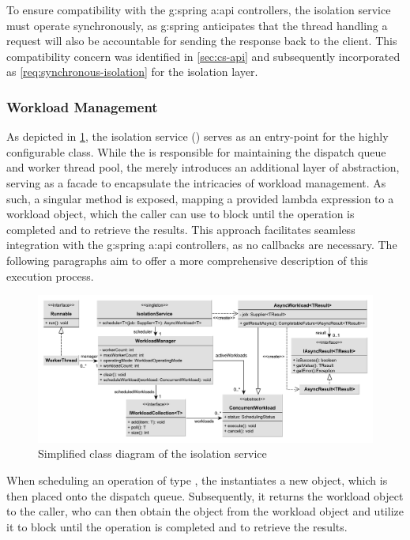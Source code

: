 To ensure compatibility with the \gls{g:spring} \gls{a:api} controllers, the isolation service must operate synchronously, as \gls{g:spring} anticipates that the thread handling a request will also be accountable for sending the response back to the client. This compatibility concern was identified in \cref{sec:cs-api} and subsequently incorporated as \cref{req:synchronous-isolation} for the isolation layer.

\pagebreak

\subsubsection{Workload Management}

As depicted in \cref{fig:workload-overview}, the isolation service () serves as an entry-point  for the highly configurable  class. While the  is responsible for maintaining the dispatch queue and worker thread pool, the  merely introduces an additional layer of abstraction, serving as a facade to encapsulate the intricacies of workload management. As such, a singular  method is exposed, mapping a provided lambda expression to a workload object, which the caller can use to block until the operation is completed and to retrieve the results. This approach facilitates seamless integration with the \gls{g:spring} \gls{a:api} controllers, as no callbacks are necessary. The following paragraphs aim to offer a more comprehensive description of this execution process.

\begin{figure}[H]
\centering
\includegraphics[width=\textwidth]{images/workload-management.pdf}
\caption{Simplified class diagram of the isolation service}
\label{fig:workload-overview}
\end{figure}

When scheduling an operation of type , the  instantiates a new  object, which is then placed onto the dispatch queue. Subsequently, it returns the workload object to the caller, who can then obtain the  object from the workload object and utilize it to block until the operation is completed and to retrieve the results.

